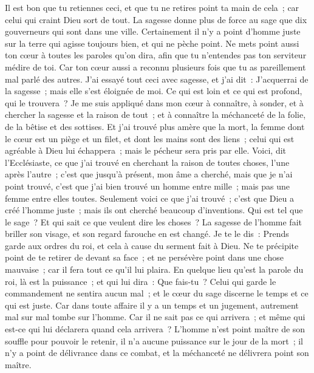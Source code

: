 \begin{multicols}{2}
Il est bon que tu retiennes ceci, et que tu ne retires point ta main de cela~; car celui qui craint Dieu sort de tout.
La sagesse donne plus de force au sage que dix gouverneurs qui sont dans une ville.
Certainement il n'y a point d'homme juste sur la terre qui agisse toujours bien, et qui ne pèche point.
Ne mets point aussi ton cœur à toutes les paroles qu'on dira, afin que tu n'entendes pas ton serviteur médire de toi.
Car ton cœur aussi a reconnu plusieurs fois que tu as pareillement mal parlé des autres.
J'ai essayé tout ceci avec sagesse, et j'ai dit~: J'acquerrai de la sagesse~; mais elle s'est éloignée de moi.
Ce qui est loin et ce qui est profond, qui le trouvera~?
Je me suis appliqué dans mon cœur à connaître, à sonder, et à chercher la sagesse et la raison de tout~; et à connaître la méchanceté de la folie, de la bêtise et des sottises.
Et j'ai trouvé plus amère que la mort, la femme dont le cœur est un piège et un filet, et dont les mains sont des liens~; celui qui est agréable à Dieu lui échappera~; mais le pécheur sera pris par elle.
Voici, dit l'Ecclésiaste, ce que j'ai trouvé en cherchant la raison de toutes choses, l'une après l'autre~;
c'est que jusqu'à présent, mon âme a cherché, mais que je n'ai point trouvé, c'est que j'ai bien trouvé un homme entre mille~; mais pas une femme entre elles toutes.
Seulement voici ce que j'ai trouvé~; c'est que Dieu a créé l'homme juste~; mais ils ont cherché beaucoup d'inventions.
\VerseOne{}Qui est tel que le sage~? Et qui sait ce que veulent dire les choses~? La sagesse de l'homme fait briller son visage, et son regard farouche en est changé.
Je te le dis~: Prends garde aux ordres du roi, et cela à cause du serment fait à Dieu.
Ne te précipite point de te retirer de devant sa face~; et ne persévère point dans une chose mauvaise~; car il fera tout ce qu'il lui plaira.
En quelque lieu qu'est la parole du roi, là est la puissance~; et qui lui dira~: Que fais-tu~?
Celui qui garde le commandement ne sentira aucun mal~; et le cœur du sage discerne le temps et ce qui est juste.
Car dans toute affaire il y a un temps et un jugement, autrement mal sur mal tombe sur l'homme.
Car il ne sait pas ce qui arrivera~; et même qui est-ce qui lui déclarera quand cela arrivera~?
L'homme n'est point maître de son souffle pour pouvoir le retenir, il n'a aucune puissance sur le jour de la mort~; il n'y a point de délivrance dans ce combat, et la méchanceté ne délivrera point son maître.

\end{multicols}

